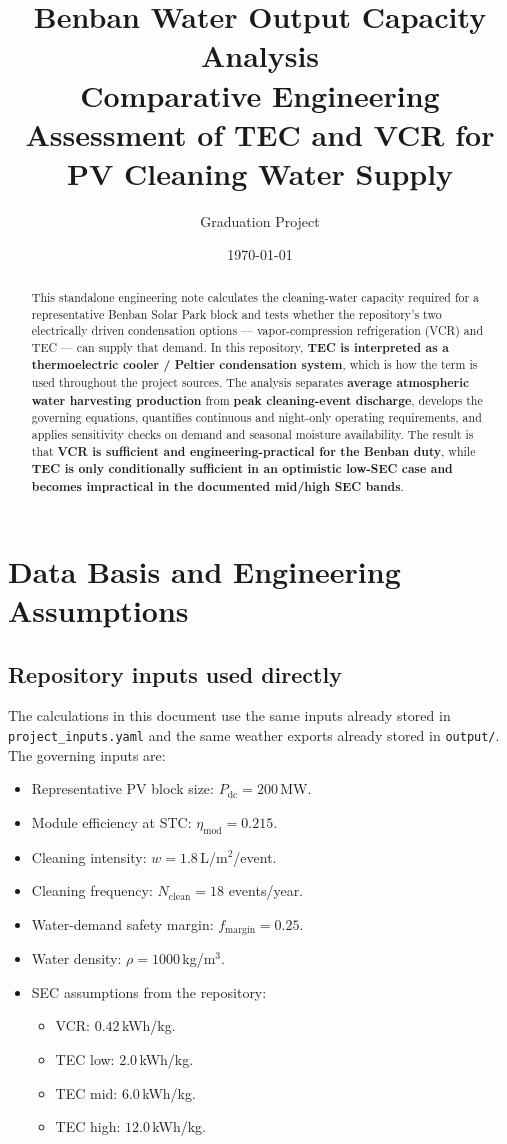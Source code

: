 \documentclass[11pt,a4paper]{article}
\title{\textbf{Benban Water Output Capacity Analysis}\\
\large Comparative Engineering Assessment of TEC and VCR for PV Cleaning Water Supply}
\author{Graduation Project}
\date{\today}
\begin{document}
\maketitle

\begin{abstract}
\noindent
This standalone engineering note calculates the cleaning-water capacity required for a representative Benban Solar Park block and tests whether the repository's two electrically driven condensation options --- vapor-compression refrigeration (VCR) and TEC --- can supply that demand. In this repository, \textbf{TEC is interpreted as a thermoelectric cooler / Peltier condensation system}, which is how the term is used throughout the project sources. The analysis separates \textbf{average atmospheric water harvesting production} from \textbf{peak cleaning-event discharge}, develops the governing equations, quantifies continuous and night-only operating requirements, and applies sensitivity checks on demand and seasonal moisture availability. The result is that \textbf{VCR is sufficient and engineering-practical for the Benban duty}, while \textbf{TEC is only conditionally sufficient in an optimistic low-SEC case and becomes impractical in the documented mid/high SEC bands}.
\end{abstract}

\section{Data Basis and Engineering Assumptions}
\subsection{Repository inputs used directly}
The calculations in this document use the same inputs already stored in \texttt{project\_inputs.yaml} and the same weather exports already stored in \texttt{output/}. The governing inputs are:
\begin{itemize}[leftmargin=*]
  \item Representative PV block size: $P_{\mathrm{dc}}=200$\,MW.
  \item Module efficiency at STC: $\eta_{\mathrm{mod}}=0.215$.
  \item Cleaning intensity: $w=1.8$\,L/m$^2$/event.
  \item Cleaning frequency: $N_{\mathrm{clean}}=18$ events/year.
  \item Water-demand safety margin: $f_{\mathrm{margin}}=0.25$.
  \item Water density: $\rho=1000$\,kg/m$^3$.
  \item SEC assumptions from the repository:
  \begin{itemize}[nosep]
    \item VCR: $0.42$\,kWh/kg.
    \item TEC low: $2.0$\,kWh/kg.
    \item TEC mid: $6.0$\,kWh/kg.
    \item TEC high: $12.0$\,kWh/kg.
  \end{itemize}
\end{itemize}
\end{document}
